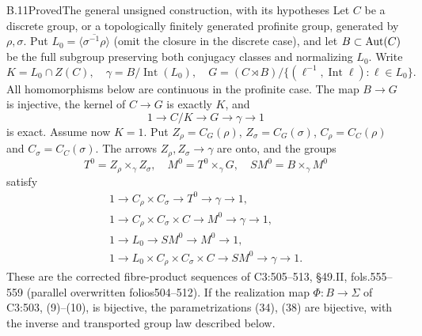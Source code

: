 \begin{statement}{B.11}{Proved}{The general unsigned construction, with its hypotheses}
Let $C$ be a discrete group, or a topologically finitely generated
profinite group, generated by $\rho,\sigma$. Put
$L_0=\overline{\langle\sigma^{-1}\rho\rangle}$ (omit the closure
in the discrete case), and let $B\subset\operatorname{Aut}(C)$ be the full
subgroup preserving both conjugacy classes and normalizing $L_0$. Write
\[
 K=L_0\cap Z(C),\quad \gamma=B/\operatorname{Int}(L_0),\quad
 G=(C\rtimes B)/\{(\ell^{-1},\operatorname{Int}\ell):\ell\in L_0\}.
\]
All homomorphisms below are continuous in the profinite case.
The map $B\to G$ is injective, the kernel of $C\to G$ is exactly
$K$, and
\[
 1\longrightarrow C/K\longrightarrow G\longrightarrow\gamma
 \longrightarrow1
\]
is exact. Assume now $K=1$. Put $Z_\rho=C_G(\rho)$,
$Z_\sigma=C_G(\sigma)$, $C_\rho=C_C(\rho)$ and
$C_\sigma=C_C(\sigma)$. The arrows $Z_\rho,Z_\sigma\to\gamma$
are onto, and the groups
\[
 T^0=Z_\rho\times_\gamma Z_\sigma,\quad
 M^0=T^0\times_\gamma G,\quad SM^0=B\times_\gamma M^0
\]
satisfy
\[
\begin{gathered}
1\to C_\rho\times C_\sigma\to T^0\to\gamma\to1,\\
1\to C_\rho\times C_\sigma\times C\to M^0\to\gamma\to1,\\
1\to L_0\to SM^0\to M^0\to1,\\
1\to L_0\times C_\rho\times C_\sigma\times C
 \to SM^0\to\gamma\to1.
\end{gathered}
\]
These are the corrected fibre-product sequences of C3:505--513,
\S49.II, fols.555--559 (parallel overwritten folios504--512).
If the realization map $\Phi:B\to\Sigma$ of C3:503, (9)--(10),
is bijective, the parametrizations (34), (38) are bijective,
with the inverse and transported group law described below.
\end{statement}
